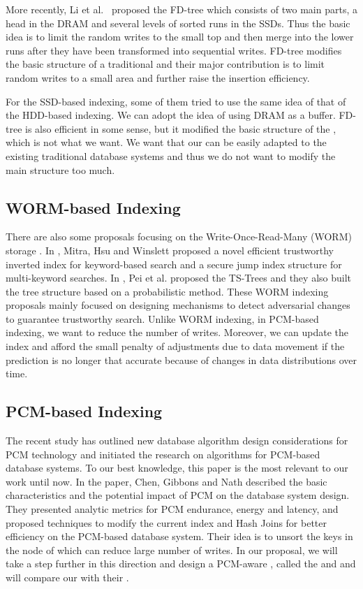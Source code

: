 More recently, Li et al.~\cite{li2010tree} proposed the FD-tree which consists of two main parts, a head \bplustree in the DRAM and several levels of sorted runs in the SSDs. Thus the basic idea is to limit the random writes to the small top \bplustree and then merge into the lower runs after they have been transformed into sequential writes. FD-tree modifies the basic structure of a traditional \bplustree and their major contribution is to limit random writes to a small area and further raise the insertion efficiency.

For the SSD-based indexing, some of them tried to use the same idea of that of the HDD-based indexing. We can adopt the idea of using DRAM as a buffer. FD-tree is also efficient in some sense, but it modified the basic structure of the \bplustree, which is not what we want. We want that our \bplustree can be easily adapted to the existing traditional database systems and thus we do not want to modify the main structure too much.


\subsection{WORM-based Indexing}
There are also some proposals focusing on the Write-Once-Read-Many (WORM) storage \cite{DBLP:conf/vldb/MitraHW06}\cite{DBLP:conf/aina/PeiLY07}. In \cite{DBLP:conf/vldb/MitraHW06}, Mitra, Hsu and Winslett proposed a novel efficient trustworthy inverted index for keyword-based search and a secure jump index structure for multi-keyword searches. In \cite{DBLP:conf/aina/PeiLY07}, Pei et al. proposed the TS-Trees and they also built the tree structure based on a probabilistic method. These WORM indexing proposals mainly focused on designing mechanisms to detect adversarial changes to guarantee trustworthy search.
Unlike WORM indexing, in PCM-based indexing, we want to reduce
the number of writes. Moreover, we can update the index and afford
the small penalty of adjustments due to data movement if the
prediction is no longer that accurate because of changes in data distributions over time.

\subsection{PCM-based Indexing}
The recent study \cite{chen2011rethinking}
has outlined new database algorithm design considerations
for PCM technology and initiated the
research on algorithms for PCM-based database systems.
To our best knowledge, this paper is the most relevant to our work until now.
In the paper, Chen, Gibbons and Nath
described the basic characteristics and the potential
impact of PCM on the database system design.
They presented analytic metrics for PCM endurance,
energy and latency, and proposed techniques to
modify the current \bplustree index and Hash Joins for better efficiency
on the PCM-based database system. Their idea is to unsort the keys in the node of \bplustree which can reduce large number of writes. In our proposal, we will take a step further in this direction and
design a PCM-aware \bplustree, called the \bptree and
and will compare our \bptree with their \bplustree.

